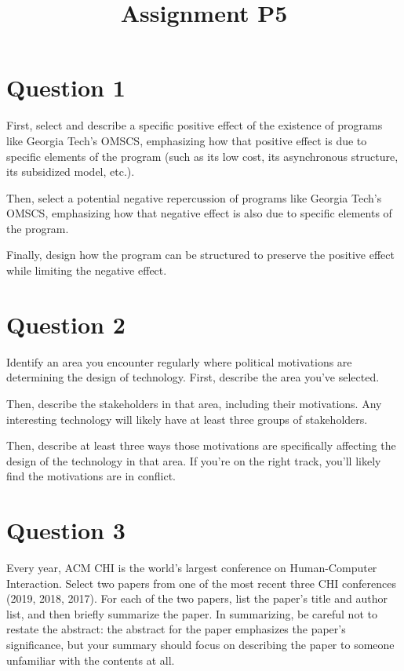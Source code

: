 

\title{Assignment P5\\}



\maketitle
\thispagestyle{fancy}

\section{Question 1}
First, select and describe a specific positive effect of the existence of programs like Georgia Tech’s OMSCS,
  emphasizing how that positive effect is due to specific elements of the program
  (such as its low cost, its asynchronous structure, its subsidized model, etc.).

Then, select a potential negative repercussion of programs like Georgia Tech’s OMSCS,
  emphasizing how that negative effect is also due to specific elements of the program.

Finally, design how the program can be structured to preserve the positive effect while limiting the negative effect.

\section{Question 2}

Identify an area you encounter regularly where political motivations are determining the design of technology.
  First, describe the area you’ve selected.

Then, describe the stakeholders in that area, including their motivations.
  Any interesting technology will likely have at least three groups of stakeholders.

Then, describe at least three ways those motivations are specifically affecting the design of the technology in that area.
  If you’re on the right track, you’ll likely find the motivations are in conflict.

\section{Question 3}

Every year, ACM CHI is the world’s largest conference on Human-Computer Interaction.
  Select two papers from one of the most recent three CHI conferences (2019, 2018, 2017).
  For each of the two papers, list the paper’s title and author list, and then briefly summarize the paper.
  In summarizing, be careful not to restate the abstract:
    the abstract for the paper emphasizes the paper’s significance,
    but your summary should focus on describing the paper to someone unfamiliar with the contents at all.

